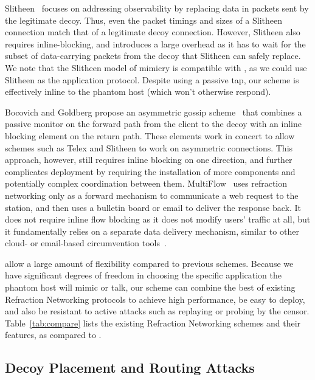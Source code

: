 Slitheen~\cite{slitheen16} focuses on addressing observability by replacing
data in packets sent by the legitimate decoy. Thus, even the packet timings and
sizes of a Slitheen connection match that of a legitimate decoy connection.
However, Slitheen also requires inline-blocking, and introduces a large overhead
as it has to wait for the subset of data-carrying packets from the decoy that
Slitheen can safely replace. We note that the Slitheen model of mimicry is
compatible with \scheme, as we could use Slitheen as the application
protocol. Despite using a passive tap, our scheme is effectively inline to the
phantom host (which won't otherwise respond).


Bocovich and Goldberg propose an asymmetric gossip scheme~\cite{secureasymmetry} that combines a passive monitor on the forward path from the client to the decoy with an inline blocking element on the return path. These elements work in concert to allow schemes such as Telex and Slitheen to work on asymmetric connections. This approach, however, still requires inline blocking on one direction, and further complicates deployment by requiring the installation of more components and potentially complex coordination between them. MultiFlow~\cite{multiflow} uses refraction networking only as a forward mechanism to communicate a web request to the station, and then uses a bulletin board or email to deliver the response back. It does not require inline flow blocking as it does not modify users' traffic at all, but it fundamentally relies on a separate data delivery mechanism, similar to other cloud- or email-based circumvention tools~\cite{SWEET-ToN,CloudTransport}.

\scheme allow a large amount of flexibility compared to previous schemes.
Because we have significant degrees of freedom in choosing the specific
application the phantom host will mimic or talk, our scheme can combine the best
of existing Refraction Networking protocols to achieve high performance, be easy
to deploy, and
also be resistant to active attacks such as replaying or probing by the censor.
Table~\ref{tab:compare} lists the existing Refraction Networking schemes and
their features, as compared to \scheme.

\subsection{Decoy Placement and Routing Attacks}

